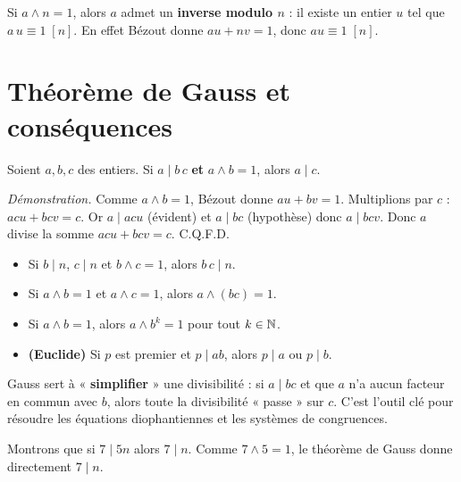 \begin{propriete}
Si $a\wedge n=1$, alors $a$ admet un \textbf{inverse modulo $n$} : il existe un entier $u$ tel
que $a\,u\equiv1\;[n]$. En effet Bézout donne $au+nv=1$, donc $au\equiv1\;[n]$.
\end{propriete}

\section{Théorème de Gauss et conséquences}

\begin{theoreme}
Soient $a,b,c$ des entiers. Si $a\mid b\,c$ \textbf{et} $a\wedge b=1$, alors $a\mid c$.
\end{theoreme}

\begin{remarque}
\textit{Démonstration.} Comme $a\wedge b=1$, Bézout donne $au+bv=1$. Multiplions par $c$ :
$acu+bcv=c$. Or $a\mid acu$ (évident) et $a\mid bc$ (hypothèse) donc $a\mid bcv$. Donc $a$
divise la somme $acu+bcv=c$. C.Q.F.D.
\end{remarque}

\begin{propriete}
\begin{itemize}
\item Si $b\mid n$, $c\mid n$ et $b\wedge c=1$, alors $b\,c\mid n$.
\item Si $a\wedge b=1$ et $a\wedge c=1$, alors $a\wedge(bc)=1$.
\item Si $a\wedge b=1$, alors $a\wedge b^{k}=1$ pour tout $k\in\mathbb{N}$.
\item \textbf{(Euclide)} Si $p$ est premier et $p\mid ab$, alors $p\mid a$ ou $p\mid b$.
\end{itemize}
\end{propriete}

\begin{aretenir}
Gauss sert à « \textbf{simplifier} » une divisibilité : si $a\mid bc$ et que $a$ n'a aucun
facteur en commun avec $b$, alors toute la divisibilité « passe » sur $c$. C'est l'outil clé
pour résoudre les équations diophantiennes et les systèmes de congruences.
\end{aretenir}

\begin{exemple}
Montrons que si $7\mid 5n$ alors $7\mid n$. Comme $7\wedge5=1$, le théorème de Gauss donne
directement $7\mid n$.
\end{exemple}

